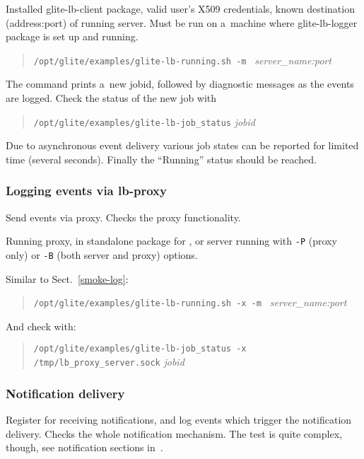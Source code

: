\req Installed glite-lb-client package, valid user's X509 credentials,
known destination (address:port) of running \LB server.
Must be run on a~machine where glite-lb-logger package is set up and running.

\how
\begin{quote}
\verb'/opt/glite/examples/glite-lb-running.sh -m ' \emph{server\_name:port}
\end{quote}

The command prints a~new jobid, followed by diagnostic messages as the events are logged. 
Check the status of the new job with
\begin{quote}
\verb'/opt/glite/examples/glite-lb-job_status' \emph{jobid}
\end{quote}

\result
Due to asynchronous event
delivery various job states can be reported for limited time (several seconds).
Finally the
``Running'' status should be reached.

\subsubsection{Logging events via lb-proxy}

Send events via \LB proxy. Checks the proxy functionality.

\req Running \LB proxy, in standalone package for , or
\LB server running with \verb'-P' (proxy only) or \verb'-B' (both server and proxy)
options.

\how Similar to Sect.~\ref{smoke-log}:
\begin{quote}
\verb'/opt/glite/examples/glite-lb-running.sh -x -m ' \emph{server\_name:port}
\end{quote}

And check with:
\begin{quote}
\verb'/opt/glite/examples/glite-lb-job_status -x /tmp/lb_proxy_server.sock' \emph{jobid}
\end{quote}


\subsubsection{Notification delivery}

Register for receiving notifications, and log events which trigger
the notification delivery. Checks the whole notification mechanism.
The test is quite complex, though, see notification sections in~\cite{lbug,lbtp}.
